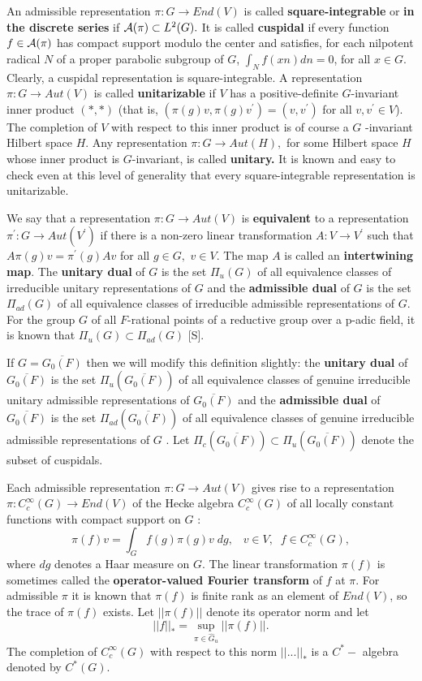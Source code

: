 An admissible representation $\pi :G\rightarrow End(V)$ is called {\bf %
square-integrable} or {\bf in the discrete series} if ${\cal A}(\pi )\subset
L^2(G).$ It is called {\bf cuspidal} if every function $f\in {\cal A}(\pi )$
has compact support modulo the center and satisfies, for each nilpotent
radical $N$ of a proper parabolic subgroup of $G$, $\int_Nf(xn)dn=0$, for
all $x\in G$. Clearly, a cuspidal representation is square-integrable. A
representation $\pi :G\rightarrow Aut(V)$ is called {\bf unitarizable} if $V$
has a positive-definite $G$-invariant inner product $(*,*)$ (that is, $(\pi
(g)v,\pi (g)v^{\prime })=(v,v^{\prime })$ for all $v,v^{\prime }\in V$). The
completion of $V$ with respect to this inner product is of course a $G$%
-invariant Hilbert space $H$. Any representation $\pi :G\rightarrow Aut(H),$
for some Hilbert space $H$ whose inner product is $G$-invariant, is called 
{\bf unitary. }It is known and easy to check even at this level of
generality that every square-integrable representation is unitarizable.

We say that a representation $\pi :G\rightarrow Aut(V)$ is {\bf equivalent}
to a representation $\pi ^{\prime }:G\rightarrow Aut(V^{\prime })$ if there
is a non-zero linear transformation $A:V\rightarrow V^{\prime }$ such that $%
A\pi (g)v=\pi ^{\prime }(g)Av$ for all $g\in G,$ $v\in V.$ The map $A$ is
called an {\bf intertwining map}. The {\bf unitary dual} of $G$ is the set $%
\Pi _u(G)$ of all equivalence classes of irreducible unitary representations
of $G$ and the {\bf admissible dual} of $G$ is the set $\Pi _{ad}(G)$ of all
equivalence classes of irreducible admissible representations of $G.$ For
the group $G$ of all $F$-rational points of a reductive group over a p-adic
field, it is known that $\Pi _u(G)\subset \Pi _{ad}(G)$ [S].

If $G=\overline{G_0(F)}$ then we will modify this definition slightly: the 
{\bf unitary dual} of $\overline{G_0(F)}$ is the set $\Pi _u(\overline{G_0(F)%
})$ of all equivalence classes of genuine irreducible unitary admissible
representations of $\overline{G_0(F)}$ and the {\bf admissible dual} of $%
\overline{G_0(F)}$ is the set $\Pi _{ad}(\overline{G_0(F)})$ of all
equivalence classes of genuine irreducible admissible representations of $G$%
. Let $\Pi _c(\overline{G_0(F)})\subset \Pi _u(\overline{G_0(F)})$ denote
the subset of cuspidals.

Each admissible representation $\pi :G\rightarrow Aut(V)$ gives rise to a
representation $\pi :C_c^\infty (G)\rightarrow End(V)$ of the Hecke algebra $%
C_c^\infty (G)$ of all locally constant functions with compact support on $G$%
: 
\[\pi (f)v=\int_Gf(g)\pi (g)v\;dg,\;\;\;v\in V,\;\;f\in C_c^\infty (G), 
\]
where $dg$ denotes a Haar measure on $G$. The linear transformation $\pi (f)$
is sometimes called the {\bf operator-valued Fourier transform} of $f$ at $%
\pi .$ For admissible $\pi $ it is known that $\pi (f)$ is finite rank as an
element of $End(V)$, so the trace of $\pi (f)$ exists. Let $||\pi (f)||$
denote its operator norm and let 
\[
||f||_{*}=\sup_{\pi \in \hat G_u}||\pi (f)||. 
\]
The completion of $C_c^\infty (G)$ with respect to this norm $||...||_{*}$
is a $C^{*}-$ algebra denoted by $C^{*}(G)$.

